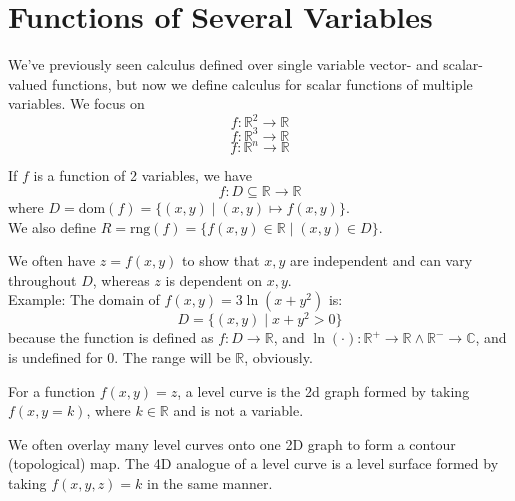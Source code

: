 \section{Functions of Several Variables}
We've previously seen calculus defined over single variable vector- and scalar-valued functions, but now we define calculus for scalar functions of multiple variables. We focus on
\[
    f:\mathbb{R} ^2\to \mathbb{R} 
\]
\[
    f:\mathbb{R} ^3\to \mathbb{R} 
\]
\[
    f:\mathbb{R} ^n\to \mathbb{R} 
\]
\begin{definition}
    If \(f\) is a function of 2 variables, we have
    \[
        f:D\subseteq \mathbb{R} \to \mathbb{R} 
    \]
    where \(D=\text{dom}(f)=\{ (x,y)\mid(x,y)\mapsto f(x,y) \}  \).\\
    We also define \(R=\text{rng}(f)=\{ f(x,y)\in\mathbb{R} \mid(x,y)\in D \}  \).
\end{definition}
We often have \(z=f(x,y)\) to show that \(x,y\) are independent and can vary throughout \(D\), whereas \(z\) is dependent on \(x,y\).\\
Example: The domain of \(f(x,y)=3\ln(x+y^2)\) is:
\[
    D=\{ (x,y)\mid x+y^2>0 \} 
\]
because the function is defined as \(f:D\to \mathbb{R} \), and \(\ln(\cdot):\mathbb{R}^{+}\to \mathbb{R} \land \mathbb{R} ^- \to \mathbb{C} \), and is undefined for \(0\). The range will be \(\mathbb{R} \), obviously.\\
\begin{definition}
    For a function \(f(x,y)=z\), a level curve is the 2d graph formed by taking \(f(x,y=k)\), where \(k\in\mathbb{R} \) and is not a variable.
\end{definition}
We often overlay many level curves onto one 2D graph to form a contour (topological) map. The 4D analogue of a level curve is a level surface formed by taking \(f(x,y,z)=k\) in the same manner.